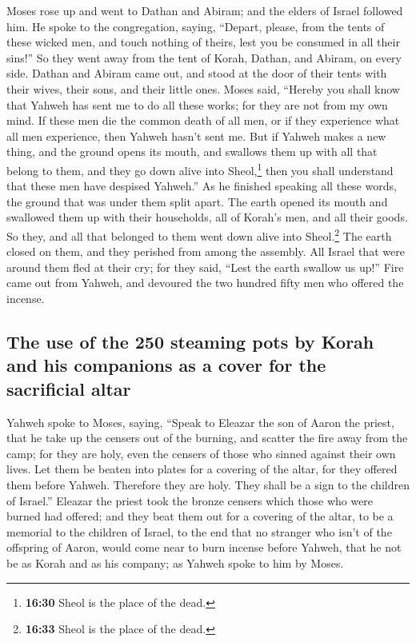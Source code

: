 Moses rose up and went to Dathan and Abiram; and the
elders of Israel followed him.  He spoke to the
congregation, saying, ``Depart, please, from the tents of these wicked
men, and touch nothing of theirs, lest you be consumed in all their
sins!''  So they went away from the tent of Korah,
Dathan, and Abiram, on every side. Dathan and Abiram came out, and stood
at the door of their tents with their wives, their sons, and their
little ones.  Moses said, ``Hereby you shall know that
Yahweh has sent me to do all these works; for they are not from my own
mind.  If these men die the common death of all men, or
if they experience what all men experience, then Yahweh hasn't sent me.
 But if Yahweh makes a new thing, and the ground opens
its mouth, and swallows them up with all that belong to them, and they
go down alive into Sheol,\footnote{\textbf{16:30} Sheol is the place of
  the dead.} then you shall understand that these men have despised
Yahweh.''  As he finished speaking all these words, the
ground that was under them split apart.  The earth opened
its mouth and swallowed them up with their households, all of Korah's
men, and all their goods.  So they, and all that belonged
to them went down alive into Sheol.\footnote{\textbf{16:33} Sheol is the
  place of the dead.} The earth closed on them, and they perished from
among the assembly.  All Israel that were around them
fled at their cry; for they said, ``Lest the earth swallow us up!''
 Fire came out from Yahweh, and devoured the two hundred
fifty men who offered the incense.

\hypertarget{the-use-of-the-250-steaming-pots-by-korah-and-his-companions-as-a-cover-for-the-sacrificial-altar}{%
\subsection{The use of the 250 steaming pots by Korah and his companions
as a cover for the sacrificial
altar}\label{the-use-of-the-250-steaming-pots-by-korah-and-his-companions-as-a-cover-for-the-sacrificial-altar}}

 Yahweh spoke to Moses, saying,  ``Speak
to Eleazar the son of Aaron the priest, that he take up the censers out
of the burning, and scatter the fire away from the camp; for they are
holy,  even the censers of those who sinned against their
own lives. Let them be beaten into plates for a covering of the altar,
for they offered them before Yahweh. Therefore they are holy. They shall
be a sign to the children of Israel.''  Eleazar the
priest took the bronze censers which those who were burned had offered;
and they beat them out for a covering of the altar,  to
be a memorial to the children of Israel, to the end that no stranger who
isn't of the offspring of Aaron, would come near to burn incense before
Yahweh, that he not be as Korah and as his company; as Yahweh spoke to
him by Moses.

